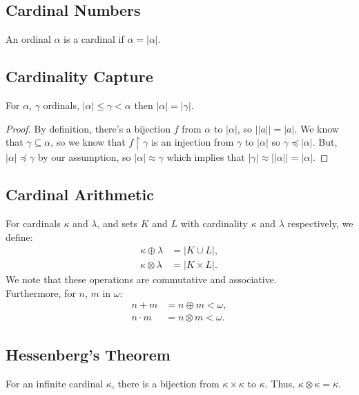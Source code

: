 \subsection{Cardinal Numbers}

An ordinal $\alpha$ is a cardinal if $\alpha = |\alpha|$.

\subsection{Cardinality Capture}

For $\alpha$, $\gamma$ ordinals,
$|\alpha| \leq \gamma < \alpha$ then $|\alpha| = |\gamma|$.

\begin{proof}
    By definition, there's a bijection $f$ from $\alpha$
    to $|\alpha|$, so $||a|| = |a|$. We know that $\gamma
    \subseteq \alpha$, so we know that
    $f \upharpoonright \gamma$ is an injection from $\gamma$ to 
    $|\alpha|$ so $\gamma \preceq |\alpha|$. But, 
    $|\alpha| \preceq \gamma$ by our assumption,
    so $|\alpha| \approx \gamma$ which implies that
    $|\gamma| \approx ||\alpha|| = |\alpha|$.
\end{proof}

\subsection{Cardinal Arithmetic}

For cardinals $\kappa$ and $\lambda$, and sets $K$ and $L$ with cardinality
$\kappa$ and $\lambda$ respectively, we define: \begin{align*}
    \kappa \oplus \lambda &= |K \cup L|, \tag{for $K$, $L$ disjoint} \\
    \kappa \otimes \lambda &= |K \times L|.
\end{align*} We note that these operations are commutative and associative.
\\[\baselineskip]
Furthermore, for $n$, $m$ in $\omega$: \begin{align*}
    n + m &= n \oplus m < \omega, \\
    n \cdot m &= n \otimes m < \omega.
\end{align*}

\subsection{Hessenberg's Theorem}

For an infinite cardinal $\kappa$, there is a bijection from $\kappa \times \kappa$
to $\kappa$. Thus, $\kappa \otimes \kappa = \kappa$.

